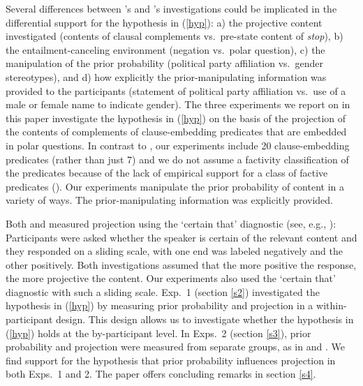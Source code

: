 \documentclass[11pt,fleqn]{article}
\newcommand{\6}{\mbox{$[\hspace*{-.6mm}[$}}
\newcommand{\9}{\mbox{$]\hspace*{-.6mm}]$}}
\newcommand{\citeposs}[1]{\citeauthor{#1}'s}
\newcommand{\jt}[1]{\textbf{\color{blue}JT: #1}}
\begin{document}
Several differences between \citeposs{mahler2020} and \citeposs{lorson2018} investigations could be implicated in the differential support for the hypothesis in (\ref{hyp}): a) the projective content investigated (contents of clausal complements vs.\ pre-state content of {\em stop}), b) the entailment-canceling environment (negation vs.\ polar question), c) the manipulation of the prior probability (political party affiliation vs.\ gender stereotypes), and d) how explicitly the prior-manipulating information was provided to the participants (statement of political party affiliation vs.\  use of a male or female name to indicate gender). The three experiments we report on in this paper investigate the hypothesis in (\ref{hyp}) on the basis of the projection of the contents of complements of clause-embedding predicates that are embedded in polar questions. In contrast to \citealt{mahler2020}, our experiments include 20 clause-embedding predicates (rather than just 7) and we do not assume a factivity classification of the predicates because of the lack of empirical support for a class of factive predicates (\citealt{tonhauser-degen-factive}). Our experiments manipulate the prior probability of content in a variety of ways. The prior-manipulating information was explicitly provided.

Both \citealt{mahler2020} and \citealt{lorson2018} measured projection using the `certain that' diagnostic (see, e.g., \citealt{tonhauser-salt26,tbd-variability,demarneffe-etal-sub23}): Participants were asked whether the speaker is certain of the relevant content and they responded on a sliding scale, with one end was labeled negatively and the other positively. Both investigations assumed that the more positive the response, the more projective the content. Our experiments also used the `certain that' diagnostic with such a sliding scale. Exp.~1 (section \ref{s2}) investigated the hypothesis in (\ref{hyp}) by measuring prior probability and projection in a within-participant design. This design allows us to investigate whether the hypothesis in (\ref{hyp}) holds at the by-participant level. In Exps.~2 (section \ref{s3}), prior probability and projection were measured from separate groups, as in \citealt{mahler2020} and \citealt{lorson2018}. We find support for the hypothesis that prior probability influences projection in both Exps.~1 and 2. The paper offers concluding remarks in section \ref{s4}. 

\end{document}
